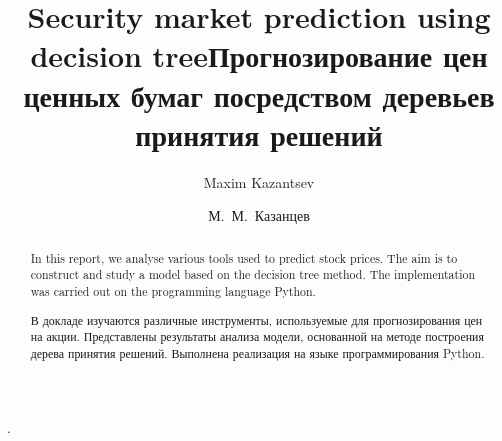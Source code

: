 \begin{englishtitle}
\title{Security market prediction using decision tree}
\author{Maxim Kazantsev}

\maketitle

\begin{abstract}
In this report, we analyse various tools used to predict stock prices. The aim is to construct and study a model based on the decision tree method. The implementation was carried out on the  programming language Python.

\end{abstract}
\end{englishtitle}


\iffalse
\documentclass[12pt]{llncs}
\usepackage[T2A]{fontenc}
\usepackage[utf8]{inputenc}
\usepackage[english,russian]{babel}
\usepackage[russian]{nla}




\fi

\title{Прогнозирование цен ценных бумаг посредством деревьев принятия решений%
}
\author{М.~М.~Казанцев%
} 
.

\maketitle

\begin{abstract}
 В докладе изучаются различные инструменты, используемые  для прогнозирования цен на акции. Представлены результаты анализа модели, основанной на методе построения дерева принятия решений. Выполнена реализация на языке программирования Python. 

\end{abstract}

